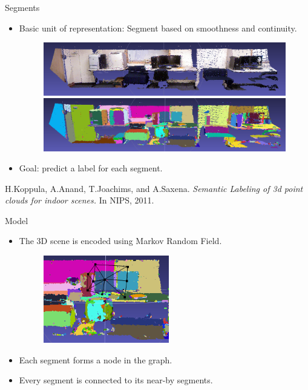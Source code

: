 \documentclass{beamer}
\begin{document}
\begin{frame}{Segments}
	\begin{itemize}
		\item Basic unit of representation: Segment based on smoothness and continuity. 
		\begin{figure}
		       \includegraphics[width=.9\linewidth]{mengo.png}\\
		       \includegraphics[width=.9\linewidth]{meng_segmented.png}
	         \end{figure}
		\item Goal: predict a label for each segment.
	\end{itemize}
	
	\vskip 0.25in
{\scriptsize
 H.Koppula, A.Anand, T.Joachims, and A.Saxena. \emph{Semantic Labeling of 3d point clouds for indoor scenes.} In NIPS, 2011.\\
}
\end{frame}


\begin{frame}{Model}
\begin{itemize}
 \item The 3D scene is encoded using Markov Random Field.
 \begin{figure}
 \includegraphics[width=.8\linewidth,height=1.5in]{segments_graph_edges.png}
 \end{figure}  
 \item Each segment forms a node in the graph.
 \item Every segment is connected to its near-by segments.
\end{itemize}
\end{frame}
\end{document}
